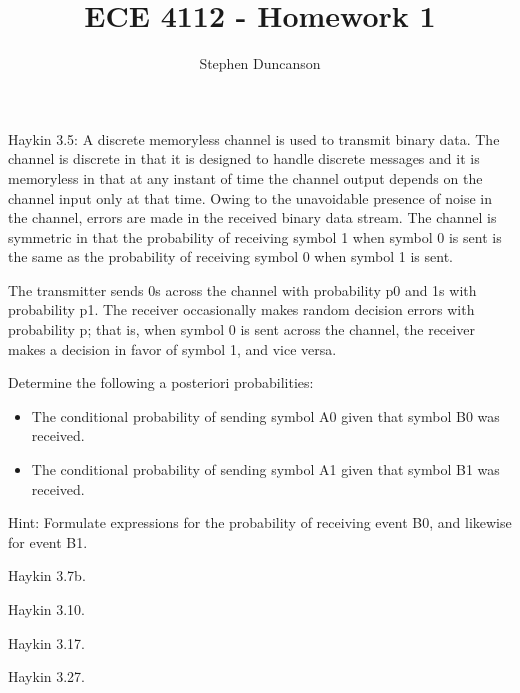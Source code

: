 \documentclass{homework}
\title{ECE 4112 - Homework 1}
\author{Stephen Duncanson}
\begin{document}
\maketitle

\exercise
Haykin 3.5: A discrete memoryless channel is used to transmit binary data. The channel is discrete in that it is designed to handle discrete messages and it is memoryless in that at any instant of time the channel output depends on the channel input only at that time. Owing to the unavoidable presence of noise in the channel, errors are made in the received binary data stream. The channel is symmetric in that the probability of receiving symbol 1 when symbol 0 is sent is the same as the probability of receiving symbol 0 when symbol 1 is sent.

The transmitter sends 0s across the channel with probability p0 and 1s with probability p1. The receiver occasionally makes random decision errors with probability p; that is, when symbol 0 is sent across the channel, the receiver makes a decision in favor of symbol 1, and vice versa.

Determine the following a posteriori probabilities:
\begin{itemize}
  \item The conditional probability of sending symbol A0 given that symbol B0 was received.
  \item The conditional probability of sending symbol A1 given that symbol B1 was received.
\end{itemize}

Hint: Formulate expressions for the probability of receiving event B0, and likewise for event B1.

\exercise*
Haykin 3.7b.

\exercise*
Haykin 3.10.

\exercise*
Haykin 3.17.

\exercise*
Haykin 3.27.
\end{document}
